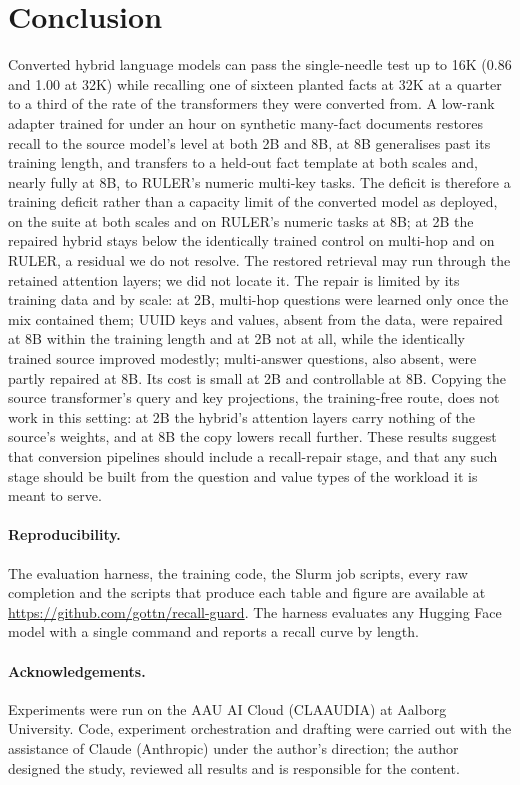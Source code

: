 \documentclass[11pt]{article}
\begin{document}
\section{Conclusion}
Converted hybrid language models can pass the single-needle test up to 16K (0.86 and 1.00 at 32K) while recalling one of sixteen planted facts at 32K at a quarter to a third of the rate of the transformers they were converted from. A low-rank adapter trained for under an hour on synthetic many-fact documents restores recall to the source model's level at both 2B and 8B, at 8B generalises past its training length, and transfers to a held-out fact template at both scales and, nearly fully at 8B, to RULER's numeric multi-key tasks. The deficit is therefore a training deficit rather than a capacity limit of the converted model as deployed, on the suite at both scales and on RULER's numeric tasks at 8B; at 2B the repaired hybrid stays below the identically trained control on multi-hop and on RULER, a residual we do not resolve. The restored retrieval may run through the retained attention layers; we did not locate it. The repair is limited by its training data and by scale: at 2B, multi-hop questions were learned only once the mix contained them; UUID keys and values, absent from the data, were repaired at 8B within the training length and at 2B not at all, while the identically trained source improved modestly; multi-answer questions, also absent, were partly repaired at 8B. Its cost is small at 2B and controllable at 8B. Copying the source transformer's query and key projections, the training-free route, does not work in this setting: at 2B the hybrid's attention layers carry nothing of the source's weights, and at 8B the copy lowers recall further. These results suggest that conversion pipelines should include a recall-repair stage, and that any such stage should be built from the question and value types of the workload it is meant to serve.

\paragraph{Reproducibility.} The evaluation harness, the training code, the Slurm job scripts, every raw completion and the scripts that produce each table and figure are available at \url{https://github.com/gottn/recall-guard}. The harness evaluates any Hugging Face model with a single command and reports a recall curve by length.

\paragraph{Acknowledgements.} Experiments were run on the AAU AI Cloud (CLAAUDIA) at Aalborg University. Code, experiment orchestration and drafting were carried out with the assistance of Claude (Anthropic) under the author's direction; the author designed the study, reviewed all results and is responsible for the content.
\end{document}
